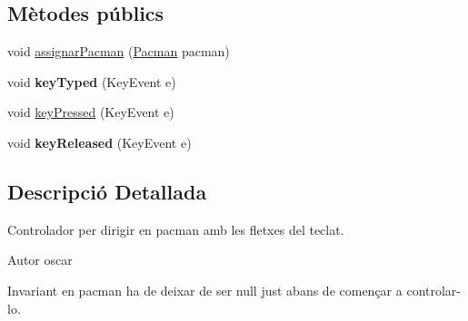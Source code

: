 \subsection*{Mètodes públics}
\begin{DoxyCompactItemize}
\item 
void \hyperlink{classlogica_1_1controladors__pacman_1_1_controlador_teclat_aab737c00c32133c65fafe6222c1eeb96}{assignar\+Pacman} (\hyperlink{classlogica_1_1_pacman}{Pacman} pacman)
\item 
\hypertarget{classlogica_1_1controladors__pacman_1_1_controlador_teclat_af77e9d281ff2d126ef0f9a0cc88b5ec6}{void {\bfseries key\+Typed} (Key\+Event e)}\label{classlogica_1_1controladors__pacman_1_1_controlador_teclat_af77e9d281ff2d126ef0f9a0cc88b5ec6}

\item 
void \hyperlink{classlogica_1_1controladors__pacman_1_1_controlador_teclat_a0681f6a89077acfc27c9934ae5a446b7}{key\+Pressed} (Key\+Event e)
\item 
\hypertarget{classlogica_1_1controladors__pacman_1_1_controlador_teclat_ac6f43e2b1c35c8878e4d22577cd9210d}{void {\bfseries key\+Released} (Key\+Event e)}\label{classlogica_1_1controladors__pacman_1_1_controlador_teclat_ac6f43e2b1c35c8878e4d22577cd9210d}

\end{DoxyCompactItemize}


\subsection{Descripció Detallada}
Controlador per dirigir en pacman amb les fletxes del teclat. 

\begin{DoxyAuthor}{Autor}
oscar
\end{DoxyAuthor}
\begin{DoxyInvariant}{Invariant}
en pacman ha de deixar de ser null just abans de començar a controlar-\/lo. 
\end{DoxyInvariant}



